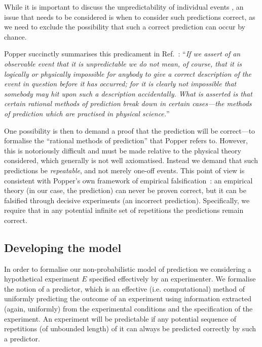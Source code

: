 \documentclass[%
 superscriptaddress,
 preprint,
 showpacs,
 showkeys,
 preprintnumbers,
  amsmath,amssymb,
  aps,
 pra,
  longbibliography,
  floatfix,
 ]{revtex4-1}
\theoremstyle{definition}
\begin{document}


While it is important to discuss the unpredictability of individual events \cite{Eagle:2005ys}, an issue that needs to be considered is when to consider such predictions correct, as we need to exclude the possibility that such a correct prediction can occur by chance.

Popper succinctly summarises this predicament in Ref.~\cite[117--118]{popper-50i}:
``\emph{If we assert of an observable event that it is unpredictable we do not mean, of course, that it is logically or physically impossible for anybody to give a correct description of the event in question before it has occurred;
for it is clearly not impossible that somebody may hit upon such a description accidentally.
What is asserted is that certain rational methods of prediction break down in certain cases---the methods of prediction which are practised in physical science.}''

One possibility is then to demand a proof that the prediction will be correct---to formalise the ``rational methods of prediction'' that Popper refers to.
However, this is notoriously difficult and must be made relative to the physical theory considered, which generally is not well axiomatised.
Instead we demand that such predictions be {\em repeatable}, and not merely one-off events.
This point of view is consistent with Popper's own framework of empirical falsification~\cite{popper,popper-en}: an empirical theory (in our case, the prediction) can never be proven correct, but it can be falsified through decisive experiments (an incorrect prediction).
Specifically, we require that in any potential infinite set of repetitions the predictions remain correct.

\subsection{Developing the model}

In order to formalise our non-probabilistic model of prediction we considering a hypothetical experiment $E$ specified effectively by an experimenter.
We formalise the notion of a predictor, which is an effective (i.e. computational) method of uniformly predicting the outcome of an experiment using information extracted (again, uniformly) from the experimental conditions and the specification of the experiment.
An experiment will be predictable if any potential sequence of repetitions (of unbounded length) of it can always be predicted correctly by such a predictor.
\end{document}
